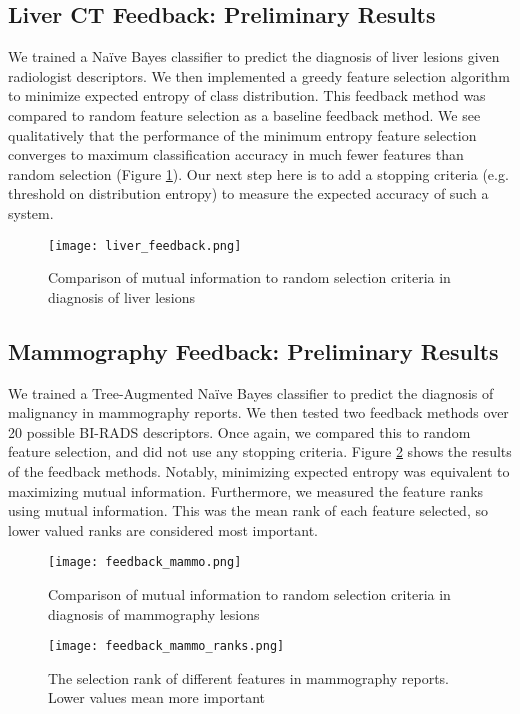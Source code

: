 \subsection{Liver CT Feedback: Preliminary Results}
We trained a Na\"{i}ve Bayes classifier to predict the diagnosis of liver lesions given radiologist descriptors. We then implemented a greedy feature selection algorithm to minimize expected entropy of class distribution. This feedback method was compared to random feature selection as a baseline feedback method. We see qualitatively that the performance of the minimum entropy feature selection converges to maximum classification accuracy in much fewer features than random selection (Figure \ref{fig:liver_feedback}). Our next step here is to add a stopping criteria (e.g. threshold on distribution entropy) to measure the expected accuracy of such a system.

\begin{figure}[h]
\centering
\texttt{[image: liver\_feedback.png]}
\caption{Comparison of mutual information to random selection criteria in diagnosis of liver lesions}
\label{fig:liver_feedback}
\end{figure}


\clearpage
\subsection{Mammography Feedback: Preliminary Results}
We trained a Tree-Augmented Na\"{i}ve Bayes classifier to predict the diagnosis of malignancy in mammography reports. We then tested two feedback methods over 20 possible BI-RADS descriptors. Once again, we compared this to random feature selection, and did not use any stopping criteria. Figure \ref{fig:feedback_mammo} shows the results of the feedback methods. Notably, minimizing expected entropy was equivalent to maximizing mutual information. Furthermore, we measured the feature ranks using mutual information. This was the mean rank of each feature selected, so lower valued ranks are considered most important.

\begin{figure}[h]
	\centering
	\texttt{[image: feedback\_mammo.png]}
	\caption{Comparison of mutual information to random selection criteria in diagnosis of mammography lesions}
	\label{fig:feedback_mammo}
\end{figure}


\begin{figure}[h]
	\centering
	\texttt{[image: feedback\_mammo\_ranks.png]}
	\caption{The selection rank of different features in mammography reports. Lower values mean more important}
	\label{fig:feedback_mammo_ranks}
\end{figure}